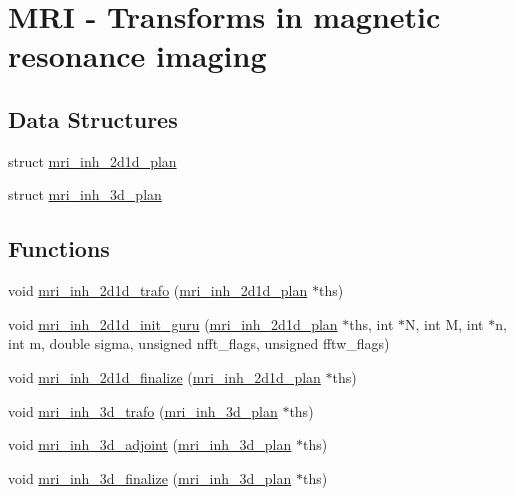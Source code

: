 \hypertarget{group__mri}{\section{M\-R\-I -\/ Transforms in magnetic resonance imaging}
\label{group__mri}
}
\subsection*{Data Structures}
\begin{DoxyCompactItemize}
\item 
struct \hyperlink{structmri__inh__2d1d__plan}{mri\-\_\-inh\-\_\-2d1d\-\_\-plan}
\item 
struct \hyperlink{structmri__inh__3d__plan}{mri\-\_\-inh\-\_\-3d\-\_\-plan}
\end{DoxyCompactItemize}
\subsection*{Functions}
\begin{DoxyCompactItemize}
\item 
void \hyperlink{group__mri_ga7c8cc36ba07eafdf8e2b5333c9c9a479}{mri\-\_\-inh\-\_\-2d1d\-\_\-trafo} (\hyperlink{structmri__inh__2d1d__plan}{mri\-\_\-inh\-\_\-2d1d\-\_\-plan} $\ast$ths)
\item 
void \hyperlink{group__mri_ga8010f0f3bd86f3bd6516751b876e6b14}{mri\-\_\-inh\-\_\-2d1d\-\_\-init\-\_\-guru} (\hyperlink{structmri__inh__2d1d__plan}{mri\-\_\-inh\-\_\-2d1d\-\_\-plan} $\ast$ths, int $\ast$N, int M, int $\ast$n, int m, double sigma, unsigned nfft\-\_\-flags, unsigned fftw\-\_\-flags)
\item 
void \hyperlink{group__mri_gaecee20a5ddbcc562e794a20e0d3e0f71}{mri\-\_\-inh\-\_\-2d1d\-\_\-finalize} (\hyperlink{structmri__inh__2d1d__plan}{mri\-\_\-inh\-\_\-2d1d\-\_\-plan} $\ast$ths)
\item 
void \hyperlink{group__mri_ga6bb9c6a50a3ba0ff081d25bf8c3262d9}{mri\-\_\-inh\-\_\-3d\-\_\-trafo} (\hyperlink{structmri__inh__3d__plan}{mri\-\_\-inh\-\_\-3d\-\_\-plan} $\ast$ths)
\item 
void \hyperlink{group__mri_gaf07fe676aecd6493bf253d62927c3a46}{mri\-\_\-inh\-\_\-3d\-\_\-adjoint} (\hyperlink{structmri__inh__3d__plan}{mri\-\_\-inh\-\_\-3d\-\_\-plan} $\ast$ths)
\item 
void \hyperlink{group__mri_ga371d6771a68d262c15ec83516c9dada3}{mri\-\_\-inh\-\_\-3d\-\_\-finalize} (\hyperlink{structmri__inh__3d__plan}{mri\-\_\-inh\-\_\-3d\-\_\-plan} $\ast$ths)
\end{DoxyCompactItemize}


